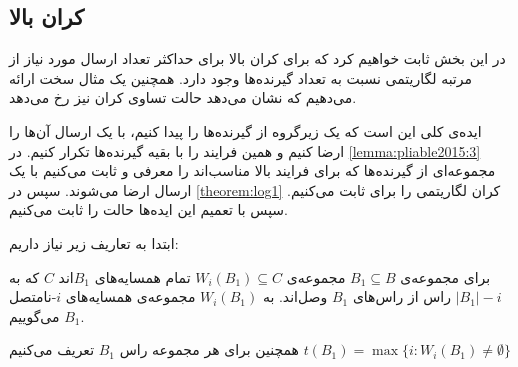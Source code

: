 \subsection{کران بالا}
در این بخش ثابت خواهیم کرد که برای
\picodt
کران بالا برای حداکثر تعداد ارسال مورد نیاز از مرتبه لگاریتمی نسبت به تعداد گیرنده‌ها وجود دارد. همچنین یک مثال سخت ارائه می‌دهیم که نشان می‌دهد حالت تساوی کران نیز رخ می‌دهد.

ایده‌ی کلی این است که یک زیرگروه از گیرنده‌ها را پیدا کنیم، با یک ارسال آن‌ها را ارضا کنیم و همین فرایند را با بقیه گیرنده‌ها تکرار کنیم. در 
\autoref{lemma:pliable2015:3} 
مجموعه‌ای از گیرنده‌ها که برای فرایند بالا مناسب‌اند را معرفی و ثابت می‌کنیم با یک ارسال ارضا می‌شوند. سپس در 
\autoref{theorem:log1}
 کران لگاریتمی را برای
 ثابت می‌کنیم. سپس با تعمیم این ایده‌ها حالت
 را ثابت می‌کنیم.

ابتدا به تعاریف زیر نیاز داریم:
	\begin{definition}
	\label{def:nonnei}
	برای مجموعه‌ی
	$B_1 \subseteq B$
	مجموعه‌ی
	$W_i(B_1) \subseteq C$
	تمام همسایه‌های
	$B_1$اند 
	$C$
	 که به 
	$|B_1| - i$
	راس از راس‌های
	$B_1$
	وصل‌اند. به
	$W_i(B_1)$
	مجموعه‌ی همسایه‌های
	$i$-نامتصل 
	$B_1$
	می‌گوییم.
	
	همچنین برای هر مجموعه‌ راس
	$B_1$
	تعریف می‌کنیم 
	$t(B_1) = \max\{i: W_i(B_1) \neq \emptyset \}$
\end{definition}

